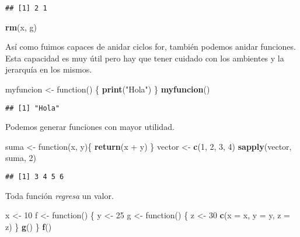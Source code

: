 \documentclass[]{article}
\newenvironment{Shaded}{\begin{snugshade}}{\end{snugshade}}
\newcommand{\KeywordTok}[1]{\textcolor[rgb]{0.13,0.29,0.53}{\textbf{{#1}}}}
\newcommand{\DataTypeTok}[1]{\textcolor[rgb]{0.13,0.29,0.53}{{#1}}}
\newcommand{\DecValTok}[1]{\textcolor[rgb]{0.00,0.00,0.81}{{#1}}}
\newcommand{\StringTok}[1]{\textcolor[rgb]{0.31,0.60,0.02}{{#1}}}
\newcommand{\NormalTok}[1]{{#1}}
\begin{document}
\begin{verbatim}
## [1] 2 1
\end{verbatim}

\begin{Shaded}
\begin{Highlighting}[]
\KeywordTok{rm}\NormalTok{(x, g)}
\end{Highlighting}
\end{Shaded}

Así como fuimos capaces de anidar ciclos for, también podemos anidar
funciones. Esta capacidad es muy útil pero hay que tener cuidado con los
ambientes y la jerarquía en los mismos.

\begin{Shaded}
\begin{Highlighting}[]
\NormalTok{myfuncion <-}\StringTok{ }\NormalTok{function() \{}
  \KeywordTok{print}\NormalTok{(}\StringTok{"Hola"}\NormalTok{)}
\NormalTok{\}}
\KeywordTok{myfuncion}\NormalTok{()}
\end{Highlighting}
\end{Shaded}

\begin{verbatim}
## [1] "Hola"
\end{verbatim}

Podemos generar funciones con mayor utilidad.

\begin{Shaded}
\begin{Highlighting}[]
\NormalTok{suma <-}\StringTok{ }\NormalTok{function(x, y)\{}
  \KeywordTok{return}\NormalTok{(x +}\StringTok{ }\NormalTok{y)}
\NormalTok{\}}
\NormalTok{vector <-}\StringTok{ }\KeywordTok{c}\NormalTok{(}\DecValTok{1}\NormalTok{, }\DecValTok{2}\NormalTok{, }\DecValTok{3}\NormalTok{, }\DecValTok{4}\NormalTok{)}
\KeywordTok{sapply}\NormalTok{(vector, suma, }\DecValTok{2}\NormalTok{)}
\end{Highlighting}
\end{Shaded}

\begin{verbatim}
## [1] 3 4 5 6
\end{verbatim}

Toda función \emph{regresa} un valor.

\begin{Shaded}
\begin{Highlighting}[]
\NormalTok{x <-}\StringTok{ }\DecValTok{10}
\NormalTok{f <-}\StringTok{ }\NormalTok{function() \{}
    \NormalTok{y <-}\StringTok{ }\DecValTok{25}
    \NormalTok{g <-}\StringTok{ }\NormalTok{function() \{}
        \NormalTok{z <-}\StringTok{ }\DecValTok{30}
        \KeywordTok{c}\NormalTok{(}\DataTypeTok{x =} \NormalTok{x, }\DataTypeTok{y =} \NormalTok{y, }\DataTypeTok{z =} \NormalTok{z)}
    \NormalTok{\}}
    \KeywordTok{g}\NormalTok{()}
\NormalTok{\}}
\KeywordTok{f}\NormalTok{()}
\end{Highlighting}
\end{Shaded}
\end{document}
